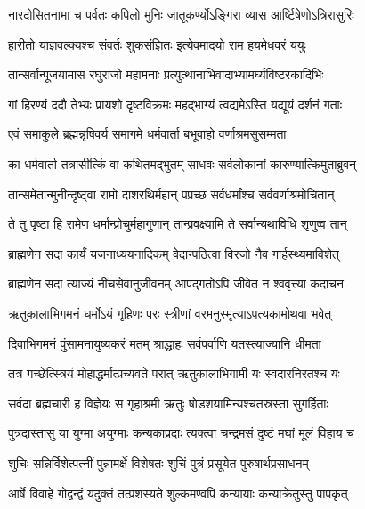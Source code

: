 \twolineshloka
{नारदोसितनामा च पर्वतः कपिलो मुनिः}
{जातूकर्ण्योऽङ्गिरा व्यास आर्ष्टिषेणोऽत्रिरासुरिः}%

\twolineshloka
{हारीतो याज्ञवल्क्यश्च संवर्तः शुकसंज्ञितः}
{इत्येवमादयो राम हयमेधवरं ययुः}%

\twolineshloka
{तान्सर्वान्पूजयामास रघुराजो महामनाः}
{प्रत्युत्थानाभिवादाभ्यामर्घ्यविष्टरकादिभिः}%

\twolineshloka
{गां हिरण्यं ददौ तेभ्यः प्रायशो दृष्टविक्रमः}
{महद्भाग्यं त्वद्यमेऽस्ति यद्यूयं दर्शनं गताः}%


\twolineshloka
{एवं समाकुले ब्रह्मन्नृषिवर्य समागमे}
{धर्मवार्ता बभूवाहो वर्णाश्रमसुसम्मता}%


\twolineshloka
{का धर्मवार्ता तत्रासीत्किं वा कथितमद्भुतम्}
{साधवः सर्वलोकानां कारुण्यात्किमुताब्रुवन्}%


\twolineshloka
{तान्समेतान्मुनीन्दृष्ट्वा रामो दाशरथिर्महान्}
{पप्रच्छ सर्वधर्मांश्च सर्ववर्णाश्रमोचितान्}%

\twolineshloka
{ते तु पृष्टा हि रामेण धर्मान्प्रोचुर्महागुणान्}
{तान्प्रवक्ष्यामि ते सर्वान्यथाविधि शृणुष्व तान्}%


\twolineshloka
{ब्राह्मणेन सदा कार्यं यजनाध्ययनादिकम्}
{वेदान्पठित्वा विरजो नैव गार्हस्थ्यमाविशेत्}%

\twolineshloka
{ब्राह्मणेन सदा त्याज्यं नीचसेवानुजीवनम्}
{आपद्गतोऽपि जीवेत न श्ववृत्त्या कदाचन}%

\twolineshloka
{ऋतुकालाभिगमनं धर्मोऽयं गृहिणः परः}
{स्त्रीणां वरमनुस्मृत्याऽपत्यकामोथवा भवेत्}%

\twolineshloka
{दिवाभिगमनं पुंसामनायुष्यकरं मतम्}
{श्राद्धाहः सर्वपर्वाणि यतस्त्याज्यानि धीमता}%

\twolineshloka
{तत्र गच्छेत्स्त्रियं मोहाद्धर्मात्प्रच्यवते परात्}
{ऋतुकालाभिगामी यः स्वदारनिरतश्च यः}%

\twolineshloka
{सर्वदा ब्रह्मचारी ह विज्ञेयः स गृहाश्रमी}
{ऋतुः षोडशयामिन्यश्चतस्रस्ता सुगर्हिताः}%

\twolineshloka
{पुत्रदास्तासु या युग्मा अयुग्माः कन्यकाप्रदाः}
{त्यक्त्वा चन्द्रमसं दुष्टं मघां मूलं विहाय च}%

\twolineshloka
{शुचिः सन्निर्विशेत्पत्नीं पुन्नामर्क्षे विशेषतः}
{शुचिं पुत्रं प्रसूयेत पुरुषार्थप्रसाधनम्}%

\twolineshloka
{आर्षे विवाहे गोद्वन्द्वं यदुक्तं तत्प्रशस्यते}
{शुल्कमण्वपि कन्यायाः कन्याक्रेतुस्तु पापकृत्}%

